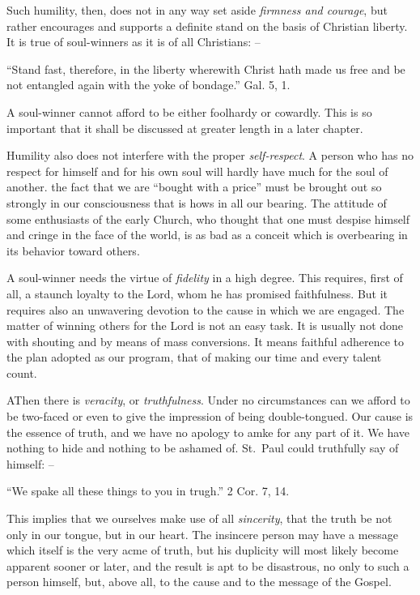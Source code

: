 \documentclass[
]{book}
\begin{document}
Such humility, then, does not in any way set aside \emph{firmness and courage}, but rather encourages and supports a definite stand on the basis of Christian liberty. It is true of soul-winners as it is of all Christians: --

``Stand fast, therefore, in the liberty wherewith Christ hath made us free and be not entangled again with the yoke of bondage.'' Gal. 5, 1.

A soul-winner cannot afford to be either foolhardy or cowardly. This is so important that it shall be discussed at greater length in a later chapter.

Humility also does not interfere with the proper \emph{self-respect}. A person who has no respect for himself and for his own soul will hardly have much for the soul of another. the fact that we are ``bought with a price'' must be brought out so strongly in our consciousness that is hows in all our bearing. The attitude of some enthusiasts of the early Church, who thought that one must despise himself and cringe in the face of the world, is as bad as a conceit which is overbearing in its behavior toward others.

A soul-winner needs the virtue of \emph{fidelity} in a high degree. This requires, first of all, a staunch loyalty to the Lord, whom he has promised faithfulness. But it requires also an unwavering devotion to the cause in which we are engaged. The matter of winning others for the Lord is not an easy task. It is usually not done with shouting and by means of mass conversions. It means faithful adherence to the plan adopted as our program, that of making our time and every talent count.

AThen there is \emph{veracity}, or \emph{truthfulness}. Under no circumstances can we afford to be two-faced or even to give the impression of being double-tongued. Our cause is the essence of truth, and we have no apology to amke for any part of it. We have nothing to hide and nothing to be ashamed of. St.~Paul could truthfully say of himself: --

``We spake all these things to you in trugh.'' 2 Cor. 7, 14.

This implies that we ourselves make use of all \emph{sincerity}, that the truth be not only in our tongue, but in our heart. The insincere person may have a message which itself is the very acme of truth, but his duplicity will most likely become apparent sooner or later, and the result is apt to be disastrous, no only to such a person himself, but, above all, to the cause and to the message of the Gospel.
\end{document}
